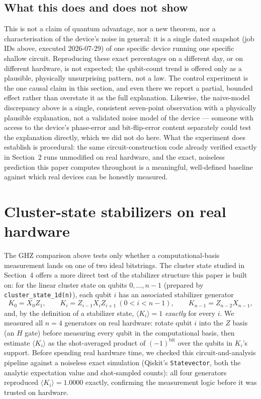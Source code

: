 \documentclass[11pt]{article}
\begin{document}
\subsection{What this does and does not show}

This is not a claim of quantum advantage, nor a new theorem, nor a
characterisation of the device's noise in general: it is a single dated
snapshot (job IDs above, executed 2026-07-29) of one specific device
running one specific shallow circuit. Reproducing these exact percentages
on a different day, or on different hardware, is not expected; the
qubit-count trend is offered only as a plausible, physically unsurprising
pattern, not a law. The control experiment is the one causal claim in
this section, and even there we report a partial, bounded effect rather
than overstate it as the full explanation. Likewise, the naive-model
discrepancy above is a
single, consistent seven-point observation with a physically plausible
explanation, not a validated noise model of the device --- someone with
access to the device's phase-error and bit-flip-error content separately
could test the explanation directly, which we did not do here. What the
experiment does establish is procedural:
the same circuit-construction code already verified exactly in
Section~2 runs unmodified on real hardware, and the exact, noiseless
prediction this paper computes throughout is a meaningful, well-defined
baseline against which real devices can be honestly measured.

\section{Cluster-state stabilizers on real hardware}\label{sec:cluster-hardware}

The GHZ comparison above tests only whether a computational-basis
measurement lands on one of two ideal bitstrings. The cluster state
studied in Section~4 offers a more direct test of the stabilizer
structure this paper is built on: for the linear cluster state on qubits
$0,\ldots,n-1$ (prepared by \texttt{cluster\_state\_1d(n)}), each qubit
$i$ has an associated stabilizer generator
\[
  K_0 = X_0 Z_1, \qquad
  K_i = Z_{i-1} X_i Z_{i+1} \ (0<i<n-1), \qquad
  K_{n-1} = Z_{n-2} X_{n-1},
\]
and, by the definition of a stabilizer state, $\langle K_i \rangle = 1$
\emph{exactly} for every $i$. We measured all $n=4$ generators on real
hardware: rotate qubit $i$ into the $Z$ basis (an $H$ gate) before
measuring every qubit in the computational basis, then estimate
$\langle K_i\rangle$ as the shot-averaged product of $(-1)^{\text{bit}}$
over the qubits in $K_i$'s support. Before spending real hardware time,
we checked this circuit-and-analysis pipeline against a noiseless exact
simulation (Qiskit's \texttt{Statevector}, both the analytic expectation
value and shot-sampled counts): all four generators reproduced
$\langle K_i\rangle = 1.0000$ exactly, confirming the measurement logic
before it was trusted on hardware.
\end{document}

